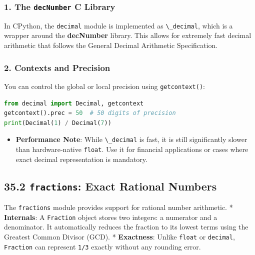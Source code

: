 \hypertarget{the-decnumber-c-library}{%
\subsubsection{\texorpdfstring{1. The \texttt{decNumber} C
Library}{1. The decNumber C Library}}\label{the-decnumber-c-library}}

In CPython, the \passthrough{\lstinline!decimal!} module is implemented
as \passthrough{\lstinline!\_decimal!}, which is a wrapper around the
\textbf{decNumber} library. This allows for extremely fast decimal
arithmetic that follows the General Decimal Arithmetic Specification.

\hypertarget{contexts-and-precision}{%
\subsubsection{2. Contexts and Precision}\label{contexts-and-precision}}

You can control the global or local precision using
\passthrough{\lstinline!getcontext()!}:

\begin{lstlisting}[language=Python]
from decimal import Decimal, getcontext
getcontext().prec = 50  # 50 digits of precision
print(Decimal(1) / Decimal(7))
\end{lstlisting}

\begin{itemize}
\tightlist
\item
  \textbf{Performance Note}: While \passthrough{\lstinline!\_decimal!}
  is fast, it is still significantly slower than hardware-native
  \passthrough{\lstinline!float!}. Use it for financial applications or
  cases where exact decimal representation is mandatory.
\end{itemize}

\hypertarget{fractions-exact-rational-numbers}{%
\subsection{\texorpdfstring{35.2 \texttt{fractions}: Exact Rational
Numbers}{35.2 fractions: Exact Rational Numbers}}\label{fractions-exact-rational-numbers}}

The \passthrough{\lstinline!fractions!} module provides support for
rational number arithmetic. * \textbf{Internals}: A
\passthrough{\lstinline!Fraction!} object stores two integers: a
numerator and a denominator. It automatically reduces the fraction to
its lowest terms using the Greatest Common Divisor (GCD). *
\textbf{Exactness}: Unlike \passthrough{\lstinline!float!} or
\passthrough{\lstinline!decimal!}, \passthrough{\lstinline!Fraction!}
can represent \passthrough{\lstinline!1/3!} exactly without any rounding
error.

